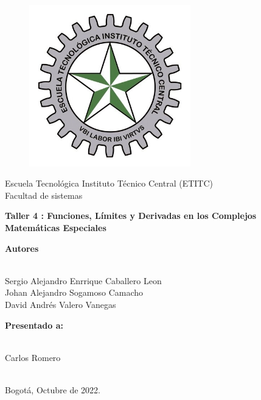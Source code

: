 \documentclass[a4paper,11pt,openany]{book}
\begin{document}
\begin{titlepage}
 
\begin{center}
\vspace*{-1in}
\begin{figure}[htb]
\begin{center}
\includegraphics[width=7cm]{ETITC.png}
\end{center}
\end{figure}
 
 
{\sc \huge Escuela Tecnológica Instituto Técnico Central (ETITC)}\\
\vspace*{0.15in}
Facultad de sistemas\\
\vspace*{0.6in}
\begin{Large}
\textbf{Taller 4 : Funciones, Límites y Derivadas en los Complejos} \\
\textbf{Matem{\'a}ticas Especiales}\\
\end{Large}
\vspace*{0.3in}
\begin{large}
{\bf Autores} \\
 
\ 
 
Sergio Alejandro Enrrique Caballero Leon\\ 
Johan Alejandro Sogamoso Camacho \\
David Andrés Valero Vanegas \\
\end{large}
\vspace*{0.3in}
 
\end{center}
 
\begin{center}
{\bf Presentado a:} \\
 
\ 
 
Carlos Romero \\
 
\
 
Bogot{\'a}, Octubre de 2022.
\end{center}
 
\end{titlepage}
\end{document}
